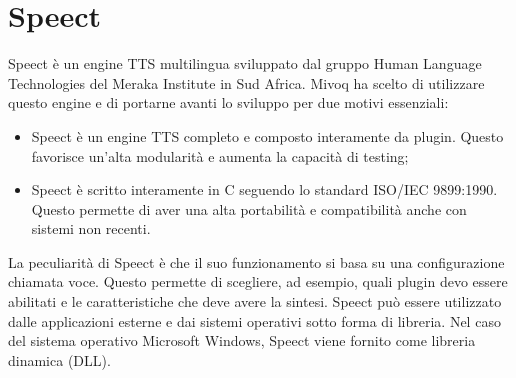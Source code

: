 \section{Speect}
Speect è un engine TTS multilingua sviluppato dal gruppo Human Language Technologies del Meraka Institute in Sud Africa. 
Mivoq ha scelto di utilizzare questo engine e di portarne avanti lo sviluppo per due motivi essenziali:
\begin{itemize}
	\item Speect è un engine TTS completo e composto interamente da plugin. Questo favorisce un'alta modularità e aumenta la capacità di testing;
	\item Speect è scritto interamente in C seguendo lo standard ISO/IEC 9899:1990. Questo permette di aver una alta portabilità e compatibilità anche con sistemi non recenti. 
\end{itemize}
La peculiarità di Speect è che il suo funzionamento si basa su una configurazione chiamata voce. Questo permette di scegliere, ad esempio, quali plugin devo essere abilitati e le caratteristiche che deve avere la sintesi.
Speect può essere utilizzato dalle applicazioni esterne e dai sistemi operativi sotto forma di libreria. Nel caso del sistema operativo Microsoft Windows, Speect viene fornito come libreria dinamica (DLL).
